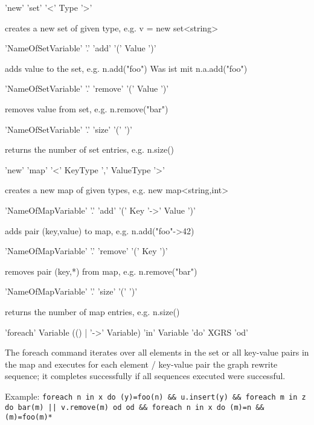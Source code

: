 \begin{rail}
  'new' 'set' '<' Type '>'
\end{rail}
creates a new set of given type, e.g. v = new set<string>

\begin{rail}
  'NameOfSetVariable' '.' 'add' '(' Value ')'
\end{rail}
adds value to the set, e.g. n.add("foo")
Was ist mit n.a.add("foo")

\begin{rail}
  'NameOfSetVariable' '.' 'remove' '(' Value ')'
\end{rail}
removes value from set, e.g. n.remove("bar")

\begin{rail}
  'NameOfSetVariable' '.' 'size' '(' ')'
\end{rail}
returns the number of set entries, e.g. n.size()

\begin{rail}
  'new' 'map' '<' KeyType ',' ValueType '>'
\end{rail}
creates a new map of given types, e.g. new map<string,int>

\begin{rail}
  'NameOfMapVariable' '.' 'add' '(' Key '->' Value ')'
\end{rail}
adds pair (key,value) to map, e.g. n.add("foo"->42)

\begin{rail}
  'NameOfMapVariable' '.' 'remove' '(' Key ')'
\end{rail}
removes pair (key,*) from map, e.g. n.remove("bar")

\begin{rail}
  'NameOfMapVariable' '.' 'size' '(' ')'
\end{rail}
returns the number of map entries, e.g. n.size()

\begin{rail}
  'foreach' Variable (() | '->' Variable) 'in' Variable 'do' XGRS 'od'
\end{rail}
The foreach command iterates over all elements in the set or all key-value pairs in the map and executes for each element / key-value pair the graph rewrite sequence; it completes successfully if all sequences executed were successful.

Example:
\verb#foreach n in x do (y)=foo(n) && u.insert(y) && foreach m in z do bar(m) || v.remove(m) od od && foreach n in x do (m)=n && (m)=foo(m)*#

